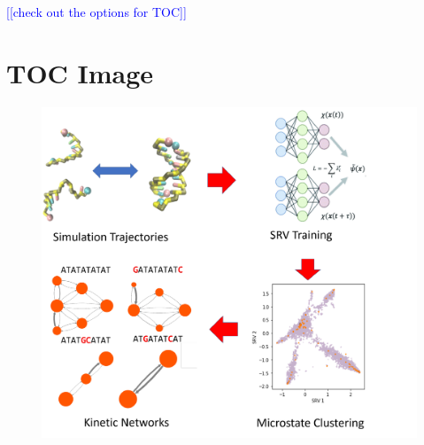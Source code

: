 \documentclass[journal=jpcbfk,manuscript=article]{achemso}
\newcommand*{\noteb}[1]{\textcolor{blue}{[[#1]]}}		%
\begin{document}
\clearpage
\newpage

%


%


\clearpage
\newpage

\noteb{check out the options for TOC}
\section*{TOC Image}

\begin{figure}[ht!]
	\begin{center} 
        \includegraphics[width=150mm, scale=1]{TOC_alternate2.pdf}
        \label{fig:TOC}
	\end{center}
\end{figure}
\end{document}
